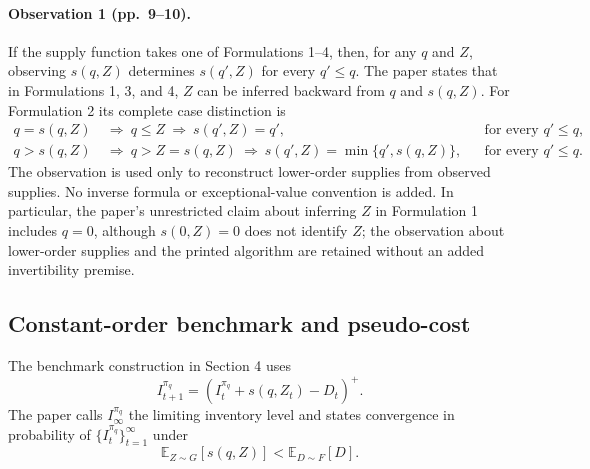 \documentclass{article}
\begin{document}
\paragraph{Observation 1 (pp.\ 9--10).}
If the supply function takes one of Formulations 1--4, then, for any \(q\) and \(Z\), observing \(s(q,Z)\) determines \(s(q',Z)\) for every \(q'\leq q\). The paper states that in Formulations 1, 3, and 4, \(Z\) can be inferred backward from \(q\) and \(s(q,Z)\). For Formulation 2 its complete case distinction is
\begin{align*}
q=s(q,Z)&\ \Longrightarrow\ q\leq Z
\ \Longrightarrow\ s(q',Z)=q',&&\text{for every }q'\leq q,\\
q>s(q,Z)&\ \Longrightarrow\ q>Z=s(q,Z)
\ \Longrightarrow\ s(q',Z)=\min\{q',s(q,Z)\},
&&\text{for every }q'\leq q.
\end{align*}
The observation is used only to reconstruct lower-order supplies from observed supplies. No inverse formula or exceptional-value convention is added. In particular, the paper's unrestricted claim about inferring \(Z\) in Formulation 1 includes \(q=0\), although \(s(0,Z)=0\) does not identify \(Z\); the observation about lower-order supplies and the printed algorithm are retained without an added invertibility premise.

\subsection*{Constant-order benchmark and pseudo-cost}
The benchmark construction in Section 4 uses
\begin{equation}
I_{t+1}^{\pi_q}=(I_t^{\pi_q}+s(q,Z_t)-D_t)^+.\tag{4}
\end{equation}
The paper calls \(I_\infty^{\pi_q}\) the limiting inventory level and states convergence in probability of \(\{I_t^{\pi_q}\}_{t=1}^{\infty}\) under
\begin{equation}
\mathbb{E}_{Z\sim G}[s(q,Z)]<\mathbb{E}_{D\sim F}[D].\tag{5}
\end{equation}
\end{document}

